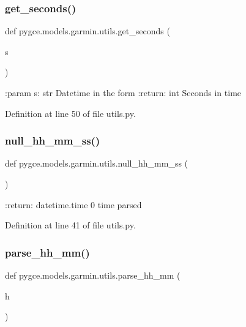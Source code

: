 \subsubsection{\texorpdfstring{get\+\_\+seconds()}{get\_seconds()}}
{\footnotesize\ttfamily def pygce.\+models.\+garmin.\+utils.\+get\+\_\+seconds (\begin{DoxyParamCaption}\item[{}]{s }\end{DoxyParamCaption})}

\begin{DoxyVerb}:param s: str
    Datetime in the form %
:return: int
    Seconds in time
\end{DoxyVerb}
 

Definition at line 50 of file utils.\+py.

\mbox{\label{namespacepygce_1_1models_1_1garmin_1_1utils_a853806377bb57d17627a9f418cec3e0c}} 
\subsubsection{\texorpdfstring{null\+\_\+hh\+\_\+mm\+\_\+ss()}{null\_hh\_mm\_ss()}}
{\footnotesize\ttfamily def pygce.\+models.\+garmin.\+utils.\+null\+\_\+hh\+\_\+mm\+\_\+ss (\begin{DoxyParamCaption}{ }\end{DoxyParamCaption})}

\begin{DoxyVerb}:return: datetime.time
    0 time parsed
\end{DoxyVerb}
 

Definition at line 41 of file utils.\+py.

\mbox{\label{namespacepygce_1_1models_1_1garmin_1_1utils_a53d4c33bdb7653260d28ee934c8e35fe}} 
\subsubsection{\texorpdfstring{parse\+\_\+hh\+\_\+mm()}{parse\_hh\_mm()}}
{\footnotesize\ttfamily def pygce.\+models.\+garmin.\+utils.\+parse\+\_\+hh\+\_\+mm (\begin{DoxyParamCaption}\item[{}]{h }\end{DoxyParamCaption})}

